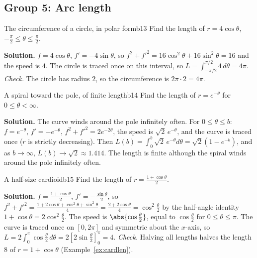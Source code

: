 \documentclass[11pt]{article}
\begin{document}
\subsection*{Group 5: Arc length}

\begin{exmp}{The circumference of a circle, in polar form}{b13}
Find the length of $r=4\cos\theta$, $-\frac\pi2\le\theta\le\frac\pi2$.

\textbf{Solution.} $f=4\cos\theta$, $f'=-4\sin\theta$, so $f^2+f'^2=16\cos^2\theta+16\sin^2\theta=16$ and the speed is $4$. The circle is traced once on this interval, so $L=\int_{-\pi/2}^{\pi/2}4\,d\theta=4\pi$. \emph{Check.} The circle has radius $2$, so the circumference is $2\pi\cdot2=4\pi$.
\end{exmp}

\begin{exmp}{A spiral toward the pole, of finite length}{b14}
Find the length of $r=e^{-\theta}$ for $0\le\theta<\infty$.

\textbf{Solution.} The curve winds around the pole infinitely often. For $0\le\theta\le b$: $f=e^{-\theta}$, $f'=-e^{-\theta}$, $f^2+f'^2=2e^{-2\theta}$, the speed is $\sqrt2\,e^{-\theta}$, and the curve is traced once ($r$ is strictly decreasing). Then $L(b)=\int_0^b\sqrt2\,e^{-\theta}d\theta=\sqrt2\left(1-e^{-b}\right)$, and as $b\to\infty$, $L(b)\to\sqrt2\approx1.414$. The length is finite although the spiral winds around the pole infinitely often.
\end{exmp}

\begin{exmp}{A half-size cardioid}{b15}
Find the length of $r=\frac{1+\cos\theta}2$.

\textbf{Solution.} $f=\frac{1+\cos\theta}2$, $f'=-\frac{\sin\theta}2$, so $f^2+f'^2=\frac{1+2\cos\theta+\cos^2\theta+\sin^2\theta}4=\frac{2+2\cos\theta}4=\cos^2\frac\theta2$ by the half-angle identity $1+\cos\theta=2\cos^2\frac\theta2$. The speed is $\abs{\cos\frac\theta2}$, equal to $\cos\frac\theta2$ for $0\le\theta\le\pi$. The curve is traced once on $[0,2\pi]$ and symmetric about the $x$-axis, so $L=2\int_0^\pi\cos\frac\theta2\,d\theta=2\left[2\sin\frac\theta2\right]_0^\pi=4$. \emph{Check.} Halving all lengths halves the length $8$ of $r=1+\cos\theta$ (Example~\ref{ex:cardlen}).
\end{exmp}
\end{document}
